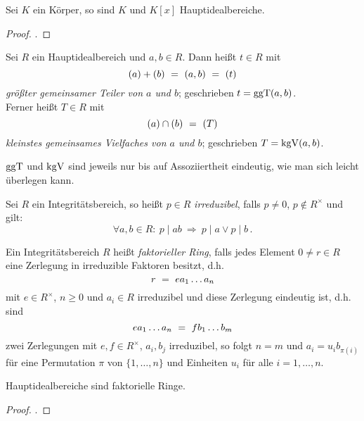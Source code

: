 \begin{lemma}
  Sei $K$ ein Körper, so sind $K$ und $K[x]$ Hauptidealbereiche.
\end{lemma}
\begin{proof}
  \autocite[Satz 17.6]{karpfinger2010algebra}.
\end{proof}

\begin{definition}
  Sei $R$ ein Hauptidealbereich und $a,b \in R$. Dann heißt $t\in R$ mit 
  \[ (a)+(b) \ =\  (a,b) \ =\  (t)\]
  \emph{größter gemeinsamer Teiler von $a$ und $b$}; 
  geschrieben $t=\operatorname{ggT}(a,b)$.\\
  Ferner heißt $T\in R$ mit 
  \[ (a)\cap (b) \ =\  (T)\]
  \emph{kleinstes gemeinsames Vielfaches von $a$ und $b$};
  geschrieben $T = \operatorname{kgV}(a,b)$.
\end{definition}


\begin{bemerkung}
  $\operatorname{ggT}$ und $\operatorname{kgV}$ sind jeweils nur bis auf Assoziiertheit 
  eindeutig, wie man sich leicht überlegen kann.
\end{bemerkung}

\begin{definition}
  Sei $R$ ein Integritätsbereich, so heißt $p\in R$ 
  \emph{irreduzibel}, falls $p\neq 0$, $p\notin R^\times$ und
  gilt:
  \[ \forall a,b \in R:\ p \mid ab \ \Rightarrow\ 
    p\mid a \lor p\mid b\,.\]
\end{definition}

\begin{definition}
  Ein Integritätsbereich $R$ heißt \emph{faktorieller Ring}, falls jedes
  Element $0\neq r \in R$ eine Zerlegung in irreduzible Faktoren besitzt, d.h.
  \[ r \ =\  e a_1 \ldots a_n\]
  mit $e \in R^\times$, $n\geq 0$ und $a_i\in R$ irreduzibel und diese
  Zerlegung eindeutig ist, d.h.  sind 
  \[ e a_1 \ldots a_n \ =\  f b_1 \ldots b_m \]
  zwei Zerlegungen mit $e, f\in R^\times$, $a_i,b_j$ irreduzibel, so
  folgt $n = m$ und $a_i = u_i b_{\pi(i)}$ für eine Permutation
  $\pi$ von $\{1,\ldots,n\}$ und Einheiten $u_i$ für alle $i=1,\ldots,n$.
\end{definition}

\begin{satz}
  \label{satz:hid_sind_faktoriell}
  Hauptidealbereiche sind faktorielle Ringe.
\end{satz}
\begin{proof}
  \autocite[Theorem II.5.2]{lang2002algebra}.
\end{proof}

